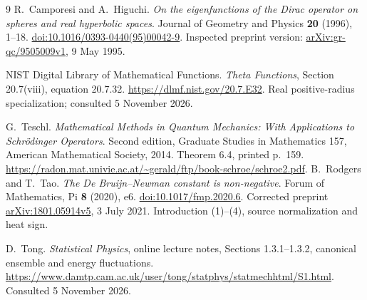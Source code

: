 \documentclass[11pt,letterpaper]{article}
\numberwithin{equation}{section}
\theoremstyle{remark}
\begin{document}
\begin{thebibliography}{9}
R.~Camporesi and A.~Higuchi.
\emph{On the eigenfunctions of the Dirac operator on spheres and real
hyperbolic spaces}.
Journal of Geometry and Physics \textbf{20} (1996), 1--18.
\href{https://doi.org/10.1016/0393-0440(95)00042-9}
{doi:10.1016/0393-0440(95)00042-9}.
Inspected preprint version:
\href{https://arxiv.org/abs/gr-qc/9505009v1}{arXiv:gr-qc/9505009v1},
9 May 1995.

NIST Digital Library of Mathematical Functions.
\emph{Theta Functions}, Section 20.7(viii), equation 20.7.32.
\url{https://dlmf.nist.gov/20.7.E32}.
Real positive-radius specialization; consulted 5 November 2026.

G.~Teschl.
\emph{Mathematical Methods in Quantum Mechanics:
With Applications to Schr\"odinger Operators}.
Second edition, Graduate Studies in Mathematics 157,
American Mathematical Society, 2014.
Theorem 6.4, printed p.~159.
\url{https://radon.mat.univie.ac.at/~gerald/ftp/book-schroe/schroe2.pdf}.
B.~Rodgers and T.~Tao.
\emph{The De Bruijn--Newman constant is non-negative}.
Forum of Mathematics, Pi \textbf{8} (2020), e6.
\href{https://doi.org/10.1017/fmp.2020.6}{doi:10.1017/fmp.2020.6}.
Corrected preprint \href{https://arxiv.org/abs/1801.05914v5}
{arXiv:1801.05914v5}, 3 July 2021.
Introduction (1)--(4), source normalization and heat sign.

D.~Tong.
\emph{Statistical Physics}, online lecture notes,
Sections 1.3.1--1.3.2, canonical ensemble and energy fluctuations.
\url{https://www.damtp.cam.ac.uk/user/tong/statphys/statmechhtml/S1.html}.
Consulted 5 November 2026.
\end{thebibliography}
\end{document}
